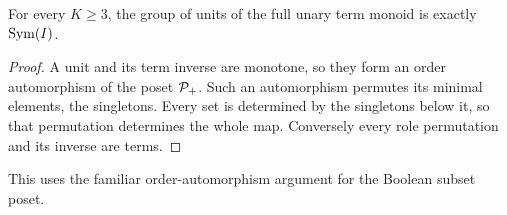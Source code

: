 \begin{proposition}
For every $K\geq3$, the group of units of the full unary term monoid is
exactly $\operatorname{Sym}(I)$.
\end{proposition}
\begin{proof}
A unit and its term inverse are monotone, so they form an order
automorphism of the poset $\mathcal P_+$. Such an automorphism permutes its
minimal elements, the singletons. Every set is determined by the
singletons below it, so that permutation determines the whole map.
Conversely every role permutation and its inverse are terms.
\end{proof}

This uses the familiar order-automorphism argument for the Boolean subset poset.
